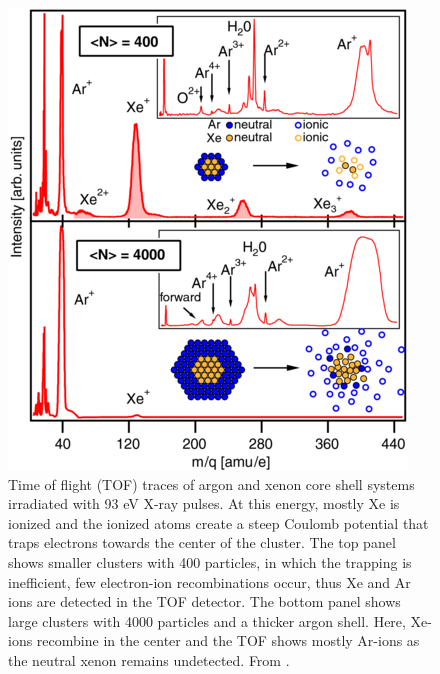 \begin{figure}
	\centering
		\includegraphics[height=0.7\textwidth]{images/Hoener-image.jpg}
	\caption[Time of flight spectra of argon and xenon core-shell systems.]{Time of flight (TOF) traces of argon and xenon core shell systems irradiated with 93 eV X-ray pulses. At this energy, mostly Xe is ionized and the ionized atoms create a steep Coulomb potential that traps electrons towards the center of the cluster. The top panel shows smaller clusters with 400 particles, in which the trapping is inefficient, few electron-ion recombinations occur, thus Xe and Ar ions are detected in the TOF detector. The bottom panel shows large clusters with 4000 particles and a thicker argon shell. Here, Xe-ions recombine in the center and the TOF shows mostly Ar-ions as the neutral xenon remains undetected. From \citep[\href{https://creativecommons.org/licenses/by/3.0/}{\ccby}]{Hoener-2008-JPB}.}
	\label{fig:Hoener-image}
\end{figure}
